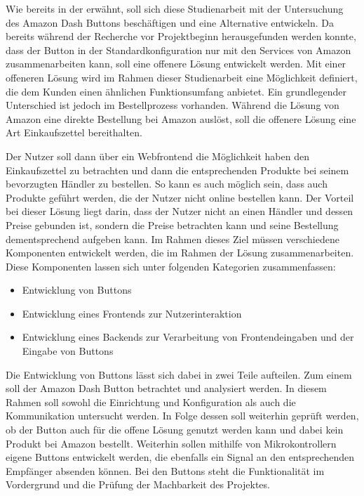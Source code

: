 Wie bereits in der  erwähnt, soll sich diese Studienarbeit mit der Untersuchung des Amazon Dash Buttons beschäftigen und eine Alternative entwickeln. Da bereits während der Recherche vor Projektbeginn herausgefunden werden konnte, dass der Button in der Standardkonfiguration nur mit den Services von Amazon zusammenarbeiten kann, soll eine offenere Lösung entwickelt werden. Mit einer offeneren Lösung wird im Rahmen dieser Studienarbeit eine Möglichkeit definiert, die dem Kunden einen ähnlichen Funktionsumfang anbietet. Ein grundlegender Unterschied ist jedoch im Bestellprozess vorhanden. Während die Lösung von Amazon eine direkte Bestellung bei Amazon auslöst, soll die offenere Lösung eine Art Einkaufszettel bereithalten. 

Der Nutzer soll dann über ein Webfrontend die Möglichkeit haben den Einkaufszettel zu betrachten und dann die entsprechenden Produkte bei seinem bevorzugten Händler zu bestellen. So kann es auch möglich sein, dass auch Produkte geführt werden, die der Nutzer nicht online bestellen kann. Der Vorteil bei dieser Lösung liegt darin, dass der Nutzer nicht an einen Händler und dessen Preise gebunden ist, sondern die Preise betrachten kann und seine Bestellung dementsprechend aufgeben kann. 
Im Rahmen dieses Ziel müssen verschiedene Komponenten entwickelt werden, die im Rahmen der Lösung zusammenarbeiten. Diese Komponenten lassen sich unter folgenden Kategorien zusammenfassen:
\begin{itemize}
\item Entwicklung von Buttons 
\item Entwicklung eines Frontends zur Nutzerinteraktion
\item Entwicklung eines Backends zur Verarbeitung von Frontendeingaben und der Eingabe von Buttons 
\end{itemize}
Die Entwicklung von Buttons lässt sich dabei in zwei Teile aufteilen. Zum einem soll der Amazon Dash Button betrachtet und analysiert werden. In diesem Rahmen soll sowohl die Einrichtung und Konfiguration als auch die Kommunikation untersucht werden. In Folge dessen soll weiterhin geprüft werden, ob der Button auch für die offene Lösung genutzt werden kann und dabei kein Produkt bei Amazon bestellt. Weiterhin sollen mithilfe von Mikrokontrollern eigene Buttons entwickelt werden, die ebenfalls ein Signal an den entsprechenden Empfänger absenden können. Bei den Buttons steht die Funktionalität im Vordergrund und die Prüfung der Machbarkeit des Projektes.


